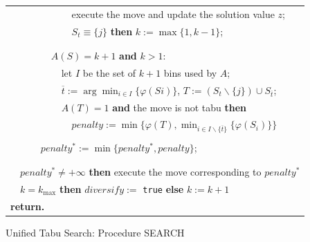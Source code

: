 \begin{figure}[h!]
\begin{center}
\begin{scriptsize}
\begin{tabular}{|lllllll|}
   &    &    &    &    &    & \hspace{1.8cm}execute the move and update the solution value $z$; \\%
   &    &    &    &    &    & \hspace{1.8cm}{\bf if}  $S_{t}\equiv\{j\}$ {\bf then} $k:= \max\{1,k-1\}$; \\%
   &    &    &    &    &    & \hspace{1.8cm}{\bf return} \\%
   &    &    &    &    & \multicolumn{2}{l|}{\hspace{1.5cm}{\bf end if;}} \\%
   &    &    &    & \multicolumn{3}{l|}{\hspace{1.2cm}$A(S)=k+1$ {\bf and} $k>1$:} \\%
   &    &    &    &    & \multicolumn{2}{l|}{\hspace{1.5cm}let $I$ be the set of $k+1$ bins used by $A$;} \\%
   &    &    &    &    & \multicolumn{2}{l|}{\hspace{1.5cm}$\overline{t}:=\arg \min_{i\in I}\{\varphi(Si)\}$, $T:=(S_{t}\backslash\{j\})\cup S_{\overline{t}}$;} \\%
   &    &    &    &    & \multicolumn{2}{l|}{\hspace{1.5cm}{\bf if} $A(T)=1$ {\bf and} the move is not tabu {\bf then}} \\%
   &    &    &    &    &    & \hspace{1.8cm}$penalty:= \min\{\varphi(T),\min_{i\in I\backslash\{\overline{t}\}}\{\varphi(S_{i})\}\}$ \\%
   &    &    & \multicolumn{4}{l|}{\hspace{0.9cm}{\bf end case;}} \\%
   &    &    & \multicolumn{4}{l|}{\hspace{0.9cm}$penalty^{*} := \min\{penalty^{*},penalty\}$;} \\%
   &    & \multicolumn{5}{l|}{\hspace{0.6cm}{\bf end for;}} \\%
   & \multicolumn{6}{l|}{\hspace{0.3cm}{\bf end for;}} \\%
   & \multicolumn{6}{l|}{\hspace{0.3cm}{\bf if} $penalty^{*}\neq +\infty$ {\bf then} execute the move corresponding to $penalty^{*}$} \\%
   & \multicolumn{6}{l|}{\hspace{0.3cm}{\bf else if} $k=k_{\max}$ {\bf then} $diversify :=$ \texttt{true} {\bf else} $k := k+1$} \\%
\multicolumn{7}{|l|}{{\bf return.}} \\\hline%
\end{tabular}
\end{scriptsize}
{\bf{\caption{Unif\mbox{}ied Tabu Search: Procedure
SEARCH}}}\label{AlgUTS_search}
\end{center}
\end{figure}
